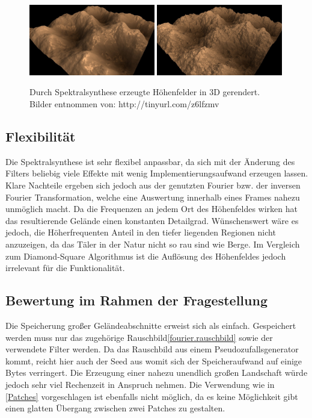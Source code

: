 \begin{figure}
	\centering
	{\includegraphics[width=0.49\textwidth]{images/fourier_24.jpg}}
	 {\includegraphics[width=0.49\textwidth]{images/fourier_20.jpg}}
	\caption{Durch Spektralsynthese erzeugte Höhenfelder in 3D gerendert. Bilder entnommen von: http://tinyurl.com/z6lfzmv}\label{img.fourierResult}
\end{figure}\label{test}

\subsection{Flexibilität}
Die Spektralsynthese ist sehr flexibel anpassbar, da sich mit der Änderung des Filters beliebig viele Effekte mit wenig Implementierungsaufwand erzeugen lassen. Klare Nachteile ergeben sich jedoch aus der genutzten Fourier bzw. der inversen Fourier Transformation, welche eine Auswertung innerhalb eines Frames nahezu unmöglich macht. Da die Frequenzen an jedem Ort des Höhenfeldes wirken hat das resultierende Gelände einen konstanten Detailgrad. Wünschenswert wäre es jedoch, die Höherfrequenten Anteil in den tiefer liegenden Regionen nicht anzuzeigen, da das Täler in der Natur nicht so rau sind wie Berge\label{unisotrop}. Im Vergleich zum Diamond-Square Algorithmus ist die Auflösung des Höhenfeldes jedoch irrelevant für die Funktionalität.

\subsection{Bewertung im Rahmen der Fragestellung}
Die Speicherung großer Geländeabschnitte erweist sich als einfach. Gespeichert werden muss nur das zugehörige Rauschbild\ref{fourier.rauschbild} sowie der verwendete Filter werden. Da das Rauschbild aus einem Pseudozufallsgenerator kommt, reicht hier auch der Seed aus womit sich der Speicheraufwand auf einige Bytes verringert.
Die Erzeugung einer nahezu unendlich großen Landschaft würde jedoch sehr viel Rechenzeit in Anspruch nehmen. Die Verwendung wie in \ref{Patches} vorgeschlagen ist ebenfalls nicht möglich, da es keine Möglichkeit gibt einen glatten Übergang zwischen zwei Patches zu gestalten.
